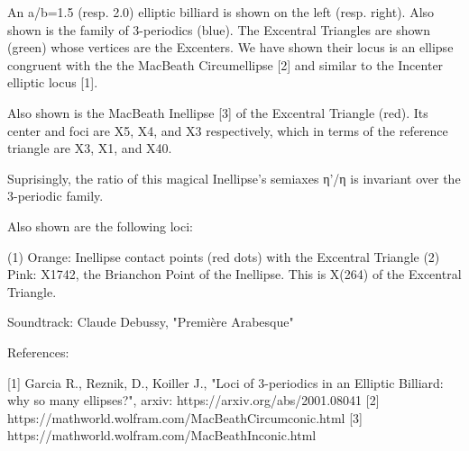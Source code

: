 An a/b=1.5 (resp. 2.0) elliptic billiard is shown on the left (resp. right). Also shown is the family of 3-periodics (blue). The Excentral Triangles are shown (green) whose vertices are the Excenters. We have shown their locus is an ellipse congruent with the the MacBeath Circumellipse [2] and similar to the Incenter elliptic locus [1].

Also shown is the MacBeath Inellipse [3] of the Excentral Triangle (red). Its center and foci are X5, X4, and X3 respectively, which in terms of the reference triangle are X3, X1, and X40.

Suprisingly, the ratio of this magical Inellipse's semiaxes η'/η is invariant over the 3-periodic family.

Also shown are the following loci:

(1) Orange: Inellipse contact points (red dots) with the Excentral Triangle
(2) Pink: X1742, the Brianchon Point of the Inellipse. This is X(264) of the Excentral Triangle.

Soundtrack: Claude Debussy, "Première Arabesque"

References:

[1] Garcia R., Reznik, D., Koiller J., "Loci of 3-periodics in an Elliptic Billiard: why so many ellipses?", arxiv: https://arxiv.org/abs/2001.08041
[2] https://mathworld.wolfram.com/MacBeathCircumconic.html
[3] https://mathworld.wolfram.com/MacBeathInconic.html